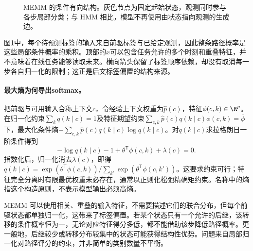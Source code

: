 \begin{figure}[htbp]
\centering
{}
\caption{MEMM 的条件有向结构。灰色节点为固定起始状态，观测同时参与各步局部分类；与 HMM 相比，模型不再使用由状态指向观测的生成边。}
\label{fig:bayes-memm-structure}
\end{figure}
图\ref{fig:bayes-memm-structure}中，每个待预测标签的输入来自前驱标签与已给定观测，因此整条路径概率是这些局部条件概率的乘积。顶部的$x$可以包含任务允许的多个时刻和重叠特征，并不意味着在线任务能够读取未来。横向箭头保留了标签顺序依赖，却没有取消每一步各自归一化的限制；这正是后文标签偏置的结构来源。

\paragraph{最大熵为何导出softmax。}
把前驱与可用输入合称上下文$c$，令经验上下文权重为$\hat p(c)$，特征$\phi(c,k)\in\R^p$。在归一化约束$\sum_kq(k\mid c)=1$及特征期望约束$\sum_{c,k}\hat p(c)q(k\mid c)\phi(c,k)=\bar\phi$下，最大化条件熵$-\sum_{c,k}\hat p(c)q(k\mid c)\log q(k\mid c)$。对$q(k\mid c)$求拉格朗日一阶条件得到
\begin{equation}
 -\log q(k\mid c)-1+\theta^{\mathsf T}\phi(c,k)+\lambda(c)=0.
\end{equation}
指数化后，归一化消去$\lambda(c)$，即得$q(k\mid c)=\exp(\theta^{\mathsf T}\phi(c,k))/\sum_{k'}\exp(\theta^{\mathsf T}\phi(c,k'))$。这要求约束可行；特征完全分离时有限最优权重未必存在，通常以正则化松弛精确矩约束。名称中的熵指这个构造原则，不表示模型输出必须高熵。

MEMM 可以使用相关、重叠的输入特征，不需要描述它们的联合分布，但每个前驱状态都单独归一化，这带来了标签偏置。若某个状态只有一个允许的后继，该转移的条件概率恒为一，无论对应特征得分多低，都不能借助该步降低路径概率。更一般地，后继较少或转移分布较集中的状态可能获得结构性优势。问题来自局部归一化对路径评分的约束，并非简单的类别数量不平衡。

